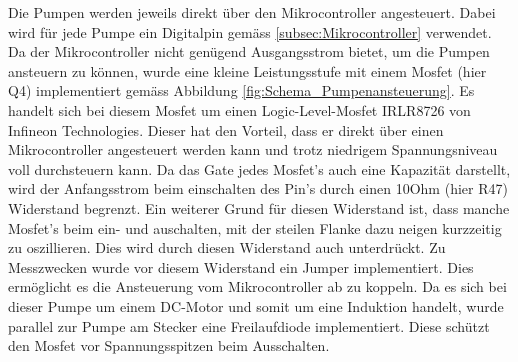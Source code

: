 Die Pumpen werden jeweils direkt über den Mikrocontroller angesteuert. Dabei wird für jede Pumpe ein Digitalpin gemäss \ref{subsec:Mikrocontroller} verwendet. Da der Mikrocontroller nicht genügend Ausgangsstrom bietet, um die Pumpen ansteuern zu können, wurde eine kleine Leistungsstufe mit einem Mosfet (hier Q4) implementiert gemäss Abbildung \ref{fig:Schema_Pumpenansteuerung}. Es handelt sich bei diesem Mosfet um einen Logic-Level-Mosfet IRLR8726 von Infineon Technologies. Dieser hat den Vorteil, dass er direkt über einen Mikrocontroller angesteuert werden kann und trotz niedrigem Spannungsniveau voll durchsteuern kann. Da das Gate jedes Mosfet's auch eine Kapazität darstellt, wird der Anfangsstrom beim einschalten des Pin's durch einen 10Ohm (hier R47) Widerstand begrenzt. Ein weiterer Grund für diesen Widerstand ist, dass manche Mosfet's beim ein- und auschalten, mit der steilen Flanke dazu neigen kurzzeitig zu oszillieren. Dies wird durch diesen Widerstand auch unterdrückt. Zu Messzwecken wurde vor diesem Widerstand ein Jumper implementiert. Dies ermöglicht es die Ansteuerung vom Mikrocontroller ab zu koppeln. Da es sich bei dieser Pumpe um einem DC-Motor und somit um eine Induktion handelt, wurde parallel zur Pumpe am Stecker eine Freilaufdiode implementiert. Diese schützt den Mosfet vor Spannungsspitzen beim Ausschalten.